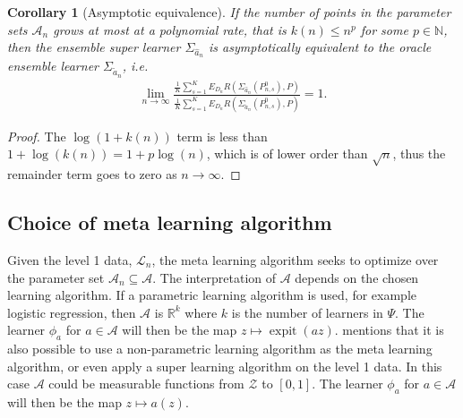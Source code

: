 \documentclass[11pt, a4paper]{article}
\newtheorem{corollary}[theorem]{Corollary}
\theoremstyle{definition}
\theoremstyle{remark}
\newcommand{\ml}{k}
\newcommand{\lib}{\Psi}
\newcommand{\lone}{\mathcal{L}}
\newcommand{\meta}{\phi}
\newcommand{\esl}{\Sigma}
\DeclareMathOperator{\expit}{expit}
\begin{document}
\begin{corollary}[Asymptotic equivalence]
    If the number of points in the parameter sets $ \mathcal{A}_n $ grows at most at a polynomial rate, that is $ k(n) \leq n^{p} $ for some $ p \in \mathbb{N} $, then the ensemble super learner $ \esl_{ \hat{a}_n } $ is asymptotically equivalent to the oracle ensemble learner $ \esl_{ \tilde{a}_n } $, i.e.
    \begin{align*}
        \lim_{n \to \infty} \frac{\frac{1}{K} \sum_{s = 1}^{K} E_{D_n} R(\esl_{ \hat{a}_n }(P_{n, s}^{0}) , P)}{\frac{1}{K} \sum_{s = 1}^{K} E_{D_n} R(\esl_{ \tilde{a}_n }(P_{n,s}^{0}), P)} = 1.
    \end{align*}
\end{corollary}
\begin{proof}
    The $ \log(1 + k(n)) $ term is less than $ 1 + \log(k(n)) = 1 + p \log(n) $, which is of lower order than $ \sqrt{n} $, thus the remainder term goes to zero as $ n \to \infty $.
\end{proof}

\subsection{Choice of meta learning algorithm} \label{simplex}
Given the level 1 data, $ \lone_n $, the meta learning algorithm seeks to optimize over the parameter set $ \mathcal{A}_n \subseteq \mathcal{A} $. The interpretation of $ \mathcal{A} $ depends on the chosen learning algorithm. If a parametric learning algorithm is used, for example logistic regression, then $ \mathcal{A} $ is $ \mathbb{R}^{\ml} $ where $ \ml $ is the number of learners in $ \lib $. The learner $ \meta_a $ for $ a \in \mathcal{A} $ will then be the map $ z \mapsto \expit(az) $.
\cite{van2007super} mentions that it is also possible to use a non-parametric learning algorithm as the meta learning algorithm, or even apply a super learning algorithm on the level 1 data. In this case $ \mathcal{A} $ could be measurable functions from $ \mathcal{Z} $ to $ [0, 1] $. The learner $ \meta_a $ for $ a \in \mathcal{A} $ will then be the map $ z \mapsto a(z) $.
\end{document}
